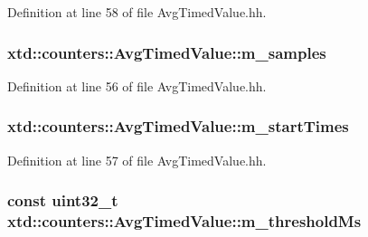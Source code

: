 Definition at line 58 of file Avg\+Timed\+Value.\+hh.

\subsubsection[{\texorpdfstring{m\+\_\+samples}{m_samples}}]{ xtd\+::counters\+::\+Avg\+Timed\+Value\+::m\+\_\+samples}\hypertarget{classxtd_1_1counters_1_1AvgTimedValue_af33c7f1f69e37ef49e4195de8f4ac6e2}{}\label{classxtd_1_1counters_1_1AvgTimedValue_af33c7f1f69e37ef49e4195de8f4ac6e2}


Definition at line 56 of file Avg\+Timed\+Value.\+hh.

\subsubsection[{\texorpdfstring{m\+\_\+start\+Times}{m_startTimes}}]{ xtd\+::counters\+::\+Avg\+Timed\+Value\+::m\+\_\+start\+Times}\hypertarget{classxtd_1_1counters_1_1AvgTimedValue_aff4e550c326e9e16ad2f9e5ff384ae2e}{}\label{classxtd_1_1counters_1_1AvgTimedValue_aff4e550c326e9e16ad2f9e5ff384ae2e}


Definition at line 57 of file Avg\+Timed\+Value.\+hh.

\subsubsection[{\texorpdfstring{m\+\_\+threshold\+Ms}{m_thresholdMs}}]{\setlength{\rightskip}{0pt plus 5cm}const uint32\+\_\+t xtd\+::counters\+::\+Avg\+Timed\+Value\+::m\+\_\+threshold\+Ms}\hypertarget{classxtd_1_1counters_1_1AvgTimedValue_a96ae1248a1019b22cf41bae4a47314c2}{}\label{classxtd_1_1counters_1_1AvgTimedValue_a96ae1248a1019b22cf41bae4a47314c2}


